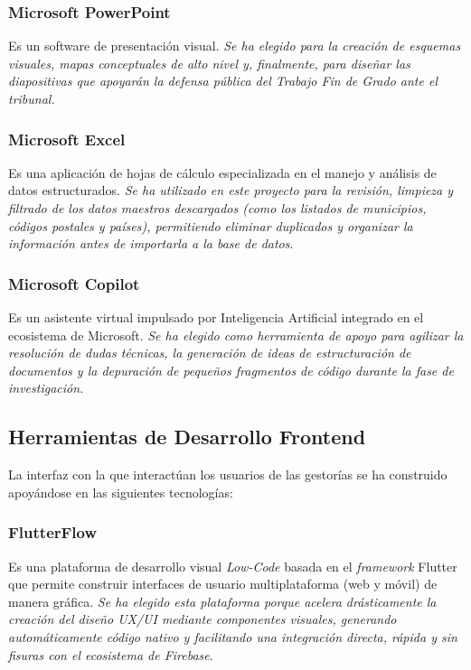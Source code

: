 \subsubsection{Microsoft PowerPoint}
Es un software de presentación visual. \textit{Se ha elegido para la creación de esquemas visuales, mapas conceptuales de alto nivel y, finalmente, para diseñar las diapositivas que apoyarán la defensa pública del Trabajo Fin de Grado ante el tribunal.}

\subsubsection{Microsoft Excel}
Es una aplicación de hojas de cálculo especializada en el manejo y análisis de datos estructurados. \textit{Se ha utilizado en este proyecto para la revisión, limpieza y filtrado de los datos maestros descargados (como los listados de municipios, códigos postales y países), permitiendo eliminar duplicados y organizar la información antes de importarla a la base de datos}.

\subsubsection{Microsoft Copilot}
Es un asistente virtual impulsado por Inteligencia Artificial integrado en el ecosistema de Microsoft. \textit{Se ha elegido como herramienta de apoyo para agilizar la resolución de dudas técnicas, la generación de ideas de estructuración de documentos y la depuración de pequeños fragmentos de código durante la fase de investigación.}

\subsection{Herramientas de Desarrollo Frontend} \label{subsct:herramientas_frontend}

La interfaz con la que interactúan los usuarios de las gestorías se ha construido apoyándose en las siguientes tecnologías:

\subsubsection{FlutterFlow}
Es una plataforma de desarrollo visual \textit{Low-Code} basada en el \textit{framework} Flutter que permite construir interfaces de usuario multiplataforma (web y móvil) de manera gráfica. \textit{Se ha elegido esta plataforma porque acelera drásticamente la creación del diseño UX/UI mediante componentes visuales, generando automáticamente código nativo y facilitando una integración directa, rápida y sin fisuras con el ecosistema de Firebase}.

